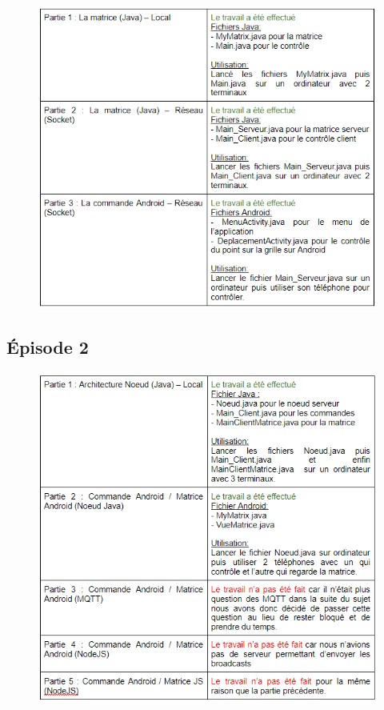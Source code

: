 \documentclass[a4paper,12pt]{report}
\begin{document}
			\paragraph*{}
			
			\begin{figure}[H]
				\centering
					\includegraphics[scale=0.9]{images/ep1.png}
				\label{ep1}
			\end{figure}
		
		\subsection{Épisode 2}
			\paragraph*{}
			
			\begin{figure}[H]
				\centering
					\includegraphics[scale=1]{images/ep2.png}
				\label{ep1}
			\end{figure}
		
\end{document}
